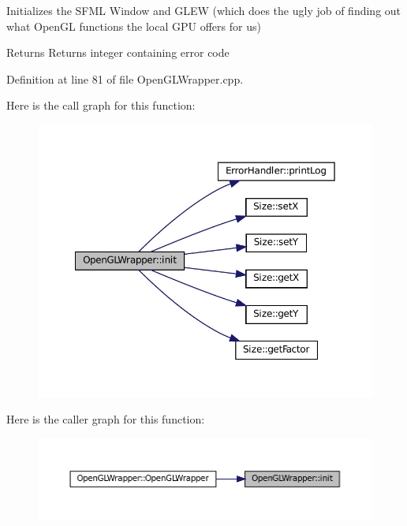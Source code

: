 Initializes the S\+F\+ML Window and G\+L\+EW (which does the ugly job of finding out what Open\+GL functions the local G\+PU offers for us) 

\begin{DoxyReturn}{Returns}
Returns integer containing error code 
\end{DoxyReturn}


Definition at line 81 of file Open\+G\+L\+Wrapper.\+cpp.

Here is the call graph for this function\+:\nopagebreak
\begin{figure}[H]
\begin{center}
\leavevmode
\includegraphics[width=350pt]{classOpenGLWrapper_af99a93ae1e6a5ed7b1422b4838065e42_cgraph}
\end{center}
\end{figure}
Here is the caller graph for this function\+:\nopagebreak
\begin{figure}[H]
\begin{center}
\leavevmode
\includegraphics[width=350pt]{classOpenGLWrapper_af99a93ae1e6a5ed7b1422b4838065e42_icgraph}
\end{center}
\end{figure}
\mbox{\label{classOpenGLWrapper_adfbe0218cff4daa4eb39cc6b53f7717f}} 

